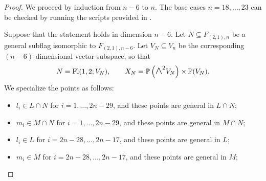 \documentclass[a4paper,reqno]{amsart}
\theoremstyle{plainnopunct}
\theoremstyle{definitionnopunct}
\newcommand{\superwedge}{\mathlarger{\mathlarger{\wedge}}}
\renewcommand{\P}{\mathbb{P}}
\DeclareMathOperator{\Fl}{Fl}
\begin{document}
\begin{proof}
We proceed by induction from $n-6$ to $n$. The base cases $n=18,\dots,23$ can be checked by running the scripts  provided in \cite{Repo}.

Suppose that the statement holds in dimension $n-6$. Let
$N
\subseteq
F_{(2,1),n}
$
be a general subflag isomorphic to $F_{(2,1),n-6}$. Let
$V_N\subseteq V_n$ be the corresponding $(n-6)$-dimensional vector
subspace, so that
\[
N
=
\Fl(1,2;V_N),
\qquad
X_N
=
\P\left(\superwedge^2V_N\right)\times\P(V_N).
\]
We specialize the points as follows:
\begin{itemize}[leftmargin=*]
    \item $l_i\in L\cap N$ for $i=1,\ldots,2n-29$, and these points
    are general in $L\cap N$;

    \item $m_i\in M\cap N$ for $i=1,\ldots,2n-29$, and these points
    are general in $M\cap N$;

    \item $l_i\in L$ for $i=2n-28,\ldots,2n-17$, and these points are
    general in $L$;

    \item $m_i\in M$ for $i=2n-28,\ldots,2n-17$, and these points are
    general in $M$;


\end{itemize}
\end{proof}
\end{document}
